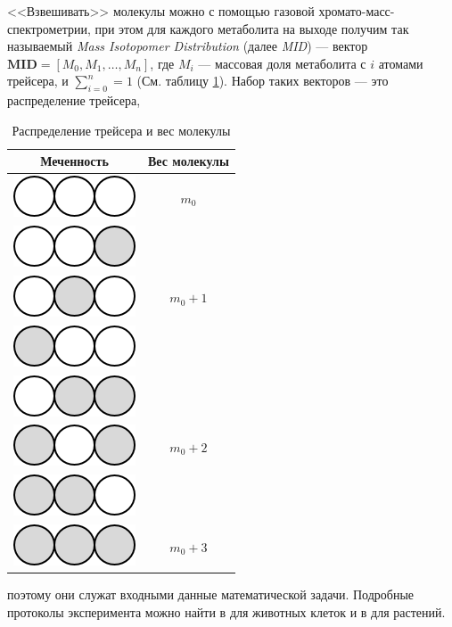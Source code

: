 \documentclass[14pt, a4paper]{extreport}
\begin{document}
<<Взвешивать>> молекулы можно с помощью газовой хромато-масс-\\спектрометрии, при этом для каждого метаболита на выходе получим так называемый \emph{Mass Isotopomer Distribution} (далее \emph{MID}) --- вектор $\boldsymbol{M\!I\!D} = [M_0, M_1, \ldots, M_n]$, где $M_i$ --- массовая доля метаболита с $i$ атомами трейсера, и $\sum_{i = 0}^{n} = 1$ (См. таблицу \ref{MID}). Набор таких векторов --- это распределение трейсера, 
\begin{table}
	\renewcommand{\arraystretch}{1.8}
	\begin{tabular}{c | c}
		\hline
		 Меченность & Вес молекулы\\ 
		\hline
		 \includegraphics{emus/000.png} & $m_0$\\
		\hline
		 \includegraphics{emus/001.png} & \\
		\includegraphics{emus/010.png} & $m_0 + 1$\\
		 \includegraphics{emus/100.png} & \\
		\hline
		 \includegraphics{emus/011.png} & \\
		 \includegraphics{emus/101.png} & $m_0 + 2$\\
		 \includegraphics{emus/110.png} & \\
		\hline
		  \includegraphics{emus/111.png} & $m_0 + 3$\\
	\end{tabular}
	\caption{Распределение трейсера и вес молекулы}
	\label{MID}
\end{table}  поэтому они служат входными данные математической задачи. Подробные протоколы эксперимента можно найти в \cite{protocol_animal} для животных клеток и в \cite{protocol_plant} для растений.
\end{document}
